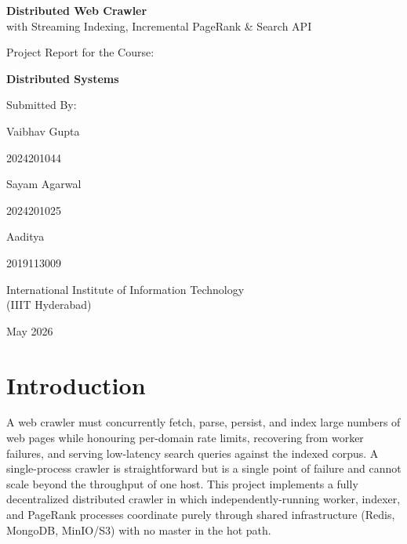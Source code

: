 \documentclass[11pt,a4paper]{article}
\begin{document}

\begin{titlepage}
\centering
\vspace*{2.2cm}
{\LARGE \textbf{Distributed Web Crawler}\\[0.3cm]
\large with Streaming Indexing, Incremental PageRank \& Search API\par}
\vspace{0.5cm}
{\large Project Report for the Course:\par}
{\large \textbf{Distributed Systems}\par}
\vspace{1.5cm}
{\large Submitted By:\par}
\vspace{0.3cm}
{\large Vaibhav Gupta\par}
{\large 2024201044\par}
\vspace{0.25cm}
{\large Sayam Agarwal\par}
{\large 2024201025\par}
\vspace{0.25cm}
{\large Aaditya\par}
{\large 2019113009\par}
\vfill
{\large International Institute of Information Technology\\(IIIT Hyderabad)\par}
\vspace{0.5cm}
{\large May 2026\par}
\end{titlepage}

\tableofcontents
\newpage
{}

\section{Introduction}

A web crawler must concurrently fetch, parse, persist, and index large numbers of web pages while honouring per-domain rate limits, recovering from worker failures, and serving low-latency search queries against the indexed corpus. A single-process crawler is straightforward but is a single point of failure and cannot scale beyond the throughput of one host. This project implements a fully decentralized distributed crawler in which independently-running worker, indexer, and PageRank processes coordinate purely through shared infrastructure (Redis, MongoDB, MinIO/S3) with no master in the hot path.
\end{document}
